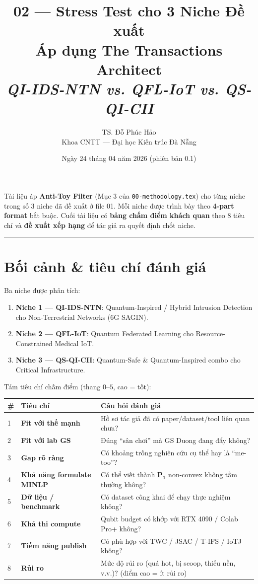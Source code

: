 \documentclass[11pt,a4paper]{article}
\title{\vspace{-1.5cm}\textbf{\color{accent} 02 --- Stress Test cho 3 Niche Đề xuất} \\[3pt]
       \Large Áp dụng The Transactions Architect \\[2pt]
       \normalsize \textit{QI-IDS-NTN vs. QFL-IoT vs. QS-QI-CII}}
\author{TS. Đỗ Phúc Hảo \\ \small Khoa CNTT --- Đại học Kiến trúc Đà Nẵng}
\date{Ngày 24 tháng 04 năm 2026 (phiên bản 0.1)}
\begin{document}
\maketitle
\thispagestyle{fancy}

\begin{note}
Tài liệu áp \textbf{Anti-Toy Filter} (Mục 3 của \texttt{00-methodology.tex}) cho từng niche trong số 3 niche đã đề xuất ở file 01. Mỗi niche được trình bày theo \textbf{4-part format} bắt buộc. Cuối tài liệu có \textbf{bảng chấm điểm khách quan} theo 8 tiêu chí và \textbf{đề xuất xếp hạng} để tác giả ra quyết định chốt niche.
\end{note}

\tableofcontents
\vspace{0.4cm}
\hrule
\vspace{0.4cm}

\section{Bối cảnh \& tiêu chí đánh giá}

Ba niche được phân tích:

\begin{enumerate}
  \item \textbf{Niche 1 --- QI-IDS-NTN}: Quantum-Inspired / Hybrid Intrusion Detection cho Non-Terrestrial Networks (6G SAGIN).
  \item \textbf{Niche 2 --- QFL-IoT}: Quantum Federated Learning cho Resource-Constrained Medical IoT.
  \item \textbf{Niche 3 --- QS-QI-CII}: Quantum-Safe \& Quantum-Inspired combo cho Critical Infrastructure.
\end{enumerate}

Tám tiêu chí chấm điểm (thang $0$--$5$, cao = tốt):

\begin{longtable}{@{}p{0.6cm} p{4.2cm} p{10cm}@{}}
\toprule
\textbf{\#} & \textbf{Tiêu chí} & \textbf{Câu hỏi đánh giá} \\
\midrule
\endhead
1 & \textbf{Fit với thế mạnh} & Hồ sơ tác giả đã có paper/dataset/tool liên quan chưa? \\
2 & \textbf{Fit với lab GS} & Đúng ``sân chơi'' mà GS Duong đang đẩy không? \\
3 & \textbf{Gap rõ ràng} & Có khoảng trống nghiên cứu cụ thể hay là ``me-too''? \\
4 & \textbf{Khả năng formulate MINLP} & Có thể viết thành $\mathbf{P_1}$ non-convex không tầm thường không? \\
5 & \textbf{Dữ liệu / benchmark} & Có dataset công khai để chạy thực nghiệm không? \\
6 & \textbf{Khả thi compute} & Qubit budget có khớp với RTX 4090 / Colab Pro+ không? \\
7 & \textbf{Tiềm năng publish} & Có phù hợp với TWC / JSAC / T-IFS / IoTJ không? \\
8 & \textbf{Rủi ro} & Mức độ rủi ro (quá hot, bị scoop, thiếu nền, v.v.)? (điểm cao = ít rủi ro) \\
\bottomrule
\end{longtable}
\end{document}
